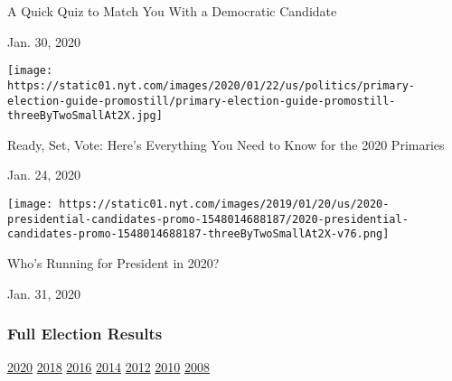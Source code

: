 A Quick Quiz to Match You With a Democratic Candidate

Jan. 30, 2020

\href{https://www.nytimes.com/interactive/2020/01/24/us/politics/presidential-primary-election-guide.html?action=click\&module=ELEX_results\&pgtype=Interactive\&region=RelatedCoverage}{}

\texttt{[image: https://static01.nyt.com/images/2020/01/22/us/politics/primary-election-guide-promostill/primary-election-guide-promostill-threeByTwoSmallAt2X.jpg]}

Ready, Set, Vote: Here's Everything You Need to Know for the 2020
Primaries

Jan. 24, 2020

\href{https://www.nytimes.com/interactive/2019/us/politics/2020-presidential-candidates.html?action=click\&module=ELEX_results\&pgtype=Interactive\&region=RelatedCoverage}{}

\texttt{[image: https://static01.nyt.com/images/2019/01/20/us/2020-presidential-candidates-promo-1548014688187/2020-presidential-candidates-promo-1548014688187-threeByTwoSmallAt2X-v76.png]}

Who's Running for President in 2020?

Jan. 31, 2020

\hypertarget{full-election-results}{%
\subsubsection{Full Election Results}\label{full-election-results}}

\href{https://www.nytimes.com/interactive/2020/us/elections/delegate-count-primary-results.html?action=click\&module=ELEX_results\&pgtype=Interactive\&region=PastResultsFooter}{2020}
\href{https://www.nytimes.com/interactive/2018/us/elections/calendar-primary-results.html?action=click\&module=ELEX_results\&pgtype=Interactive\&region=PastResultsFooter}{2018}
\href{https://www.nytimes.com/elections/2016/results/president?action=click\&module=ELEX_results\&pgtype=Interactive\&region=PastResultsFooter}{2016}
\href{https://www.nytimes.com/elections/2014/results/senate?action=click\&module=ELEX_results\&pgtype=Interactive\&region=PastResultsFooter}{2014}
\href{https://www.nytimes.com/elections/2012/results/president.html?action=click\&module=ELEX_results\&pgtype=Interactive\&region=PastResultsFooter}{2012}
\href{https://www.nytimes.com/elections/2010/results/senate.html?action=click\&module=ELEX_results\&pgtype=Interactive\&region=PastResultsFooter}{2010}
\href{https://www.nytimes.com/elections/2008/results/president/map.html?action=click\&module=ELEX_results\&pgtype=Interactive\&region=PastResultsFooter}{2008}

